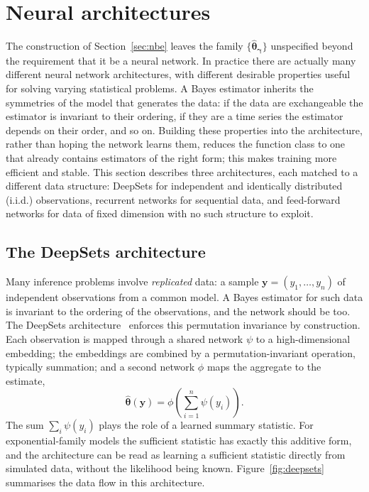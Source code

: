 \section{Neural architectures}
\label{sec:architectures}

The construction of Section~\ref{sec:nbe} leaves the family
$\{\hat{\bm{\theta}}_{\bm{\gamma}}\}$ unspecified beyond the
requirement that it be a neural network. In practice there are actually many different neural network architectures, with different desirable properties useful for solving varying statistical problems. A Bayes estimator inherits the symmetries of the model that
generates the data: if the data are exchangeable the estimator is
invariant to their ordering, if they are a time series the estimator
depends on their order, and so on. Building these properties into the
architecture, rather than hoping the network learns them, reduces the
function class to one that already contains estimators of the right
form; this makes training more efficient and stable. This section
describes three architectures, each matched to a different data
structure: DeepSets for independent and identically distributed (i.i.d.)
observations, recurrent networks for sequential data, and feed-forward networks for data of fixed
dimension with no such structure to exploit.

\subsection{The DeepSets architecture}
\label{sec:deepsets}

Many inference problems involve \emph{replicated} data: a sample
$\mathbf{y} = (y_1, \dots, y_n)$ of independent observations from a
common model. A Bayes estimator for such data is invariant to the
ordering of the observations, and the network should be too. The
DeepSets architecture~\citep{zaheer2017deepsets} enforces this
permutation invariance by construction. Each observation is mapped
through a shared network $\psi$ to a high-dimensional embedding; the embeddings are
combined by a permutation-invariant operation, typically summation;
and a second network $\phi$ maps the aggregate to the estimate,
%
\begin{equation}
  \hat{\bm{\theta}}(\mathbf{y})
  = \phi\!\left(\sum_{i=1}^{n} \psi(y_i)\right).
  \label{eq:deepsets}
\end{equation}
%
The sum $\sum_i \psi(y_i)$ plays the role of a learned summary
statistic. For exponential-family models the sufficient statistic has
exactly this additive form, and the architecture can be read as
learning a sufficient statistic directly from simulated data, without
the likelihood being known. Figure~\ref{fig:deepsets} summarises the
data flow in this architecture.

